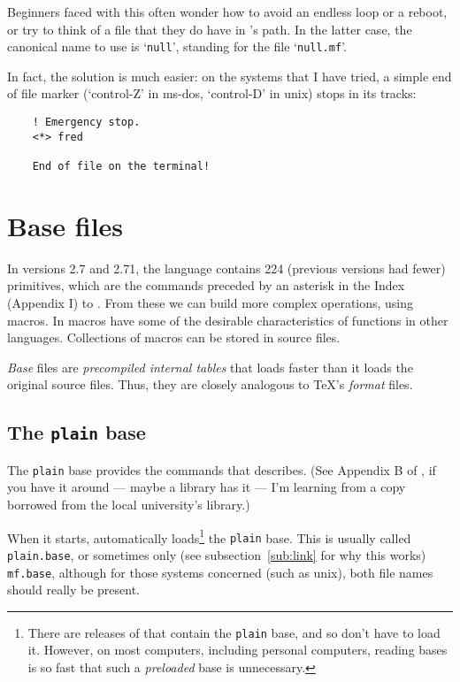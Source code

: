 Beginners faced with this often wonder how to avoid an endless loop
or a reboot, or try to think of a \MF{} file that they do have
in \MF{}'s path.  In the latter case, the canonical name to use
is `{\tt null}', standing for the file `{\tt null.mf}'.

In fact, the solution is much easier:  on the
systems that I have tried, a simple end of file marker
(`control-Z' in {\sc ms-dos}, `control-D' in {\sc unix})
stops \MF{} in its tracks:
\begin{verbatim}
    ! Emergency stop.
    <*> fred

    End of file on the terminal!
\end{verbatim}


\section{Base files}\label{sec:base}

In versions 2.7 and 2.71, the \MF{} language contains 224
(previous versions had fewer) primitives,
which are the commands preceded by an asterisk in the Index (Appendix I)
to \MFbook{}.  From these we can build more complex operations,
using macros.  In \MF{} macros have some of the desirable
characteristics of functions in other languages.  Collections of
macros can be stored in \MF{} source files.

{\em Base\/} files are {\em precompiled internal tables\/} that \MF{}
loads faster than it loads the original \MF{} source files.
Thus, they are closely analogous to \TeX{}'s {\em format\/} files.


\subsection{The {\tt plain} base}\label{sub:plain}

The {\tt plain} base provides the commands that \MFbook{}
describes.  (See Appendix B of \MFbook{}, if you have it around
--- maybe a library has it --- I'm learning from a copy borrowed from the
local university's library.)

When it starts, \MF{} automatically loads\footnote
{There are releases of \MF{} that contain the {\tt plain} base,
and so don't have to load it.  However, on most computers, including
personal computers, reading bases is so fast that such a {\em preloaded\/}
base is unnecessary.}
the {\tt plain} base.
This is usually called {\tt plain.base}, or sometimes only (see
subsection~\ref{sub:link} for why this works) {\tt mf.base},
although for those systems concerned (such as {\sc unix}),
both file names should really be present.

